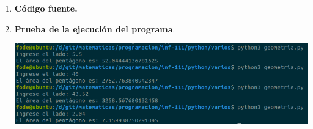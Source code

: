 \begin{enumerate}
\begin{enumerate}[\bfseries a)]
    
    \item \textbf{Código fuente.}\\ 
	
	
	\vspace{1cm}
    
    \item \textbf{Prueba de la ejecución del programa}.\\
	\begin{center}
	    \includegraphics[scale=.5]{imagenes/extras/geometria.png}
	\end{center}

\end{enumerate}

\newpage
\end{enumerate}

